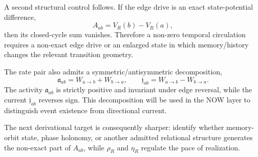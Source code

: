 A second structural control follows. If the edge drive is an exact state-potential difference,
\[
A_{ab}=V_R(b)-V_R(a),
\]
then its closed-cycle sum vanishes. Therefore a non-zero temporal circulation requires a non-exact edge drive or an enlarged state in which memory/history changes the relevant transition geometry.

The rate pair also admits a symmetric/antisymmetric decomposition,
\[
\mathfrak a_{ab}=W_{a\to b}+W_{b\to a},
\qquad
\mathfrak j_{ab}=W_{a\to b}-W_{b\to a}.
\]
The activity $\mathfrak a_{ab}$ is strictly positive and invariant under edge reversal, while the current $\mathfrak j_{ab}$ reverses sign. This decomposition will be used in the NOW layer to distinguish event existence from directional current.

The next derivational target is consequently sharper: identify whether memory-orbit state, phase holonomy, or another admitted relational structure generates the non-exact part of $A_{ab}$, while $\rho_R$ and $\eta_R$ regulate the pace of realization.
